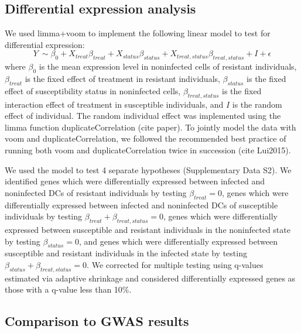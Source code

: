 \documentclass[fleqn,10pt]{wlscirep}
\begin{document}
\subsection*{Differential expression analysis}

We used limma+voom \cite{Smyth2004, Law2014, Ritchie2015} to implement
the following linear model to test for differential expression:
\begin{equation} \label{eq:limma}
Y\ \sim \beta_{0} + X_{treat}\beta_{treat} + X_{status}\beta_{status} + X_{treat,status}\beta_{treat,status} + I + \epsilon
\end{equation}
where $\beta_{0}$ is the mean expression level in noninfected cells of
resistant individuals, $\beta_{treat}$ is the fixed effect of
treatment in resistant individuals, $\beta_{status}$ is the fixed
effect of susceptibility status in noninfected cells,
$\beta_{treat,status}$ is the fixed interaction effect of treatment in
susceptible individuals, and $I$ is the random effect of individual.
The random individual effect was implemented using the limma function
duplicateCorrelation (cite paper). To jointly model the data with voom
and duplicateCorrelation, we followed the recommended best practice of
running both voom and duplicateCorrelation twice in succession (cite
Lui2015).

We used the model to test 4 separate hypotheses (Supplementary Data
S2). We identified genes which were differentially expressed between
infected and noninfected DCs of resistant individuals by testing
$\beta_{treat} = 0$, genes which were differentially expressed between
infected and noninfected DCs of susceptible individuals by testing
$\beta_{treat} + \beta_{treat,status} = 0$, genes which were
differentially expressed between susceptible and resistant individuals
in the noninfected state by testing $\beta_{status} = 0$, and genes
which were differentially expressed between susceptible and resistant
individuals in the infected state by testing $\beta_{status} +
\beta_{treat,status} = 0$. We corrected for multiple testing using
q-values estimated via adaptive shrinkage \cite{Stephens2016} and
considered differentially expressed genes as those with a q-value less
than 10\%.
\subsection*{Comparison to GWAS results}
\end{document}
